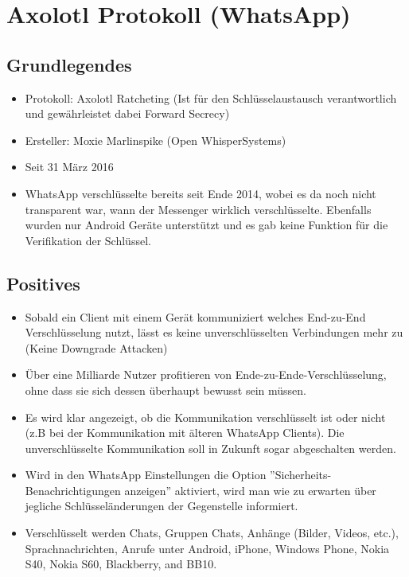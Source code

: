 


\newcommand{\SUBJECT}{Zusammenfassung}
\newcommand{\TITLE}{Informationssicherheit 1}



\section{Axolotl Protokoll (WhatsApp)}
\subsection{Grundlegendes}
\begin{itemize}
	\item Protokoll: Axolotl Ratcheting (Ist für den Schlüsselaustausch verantwortlich und gewährleistet dabei Forward Secrecy)
	\item Ersteller: Moxie Marlinspike (Open WhisperSystems)
	\item Seit 31 März 2016
	\item WhatsApp verschlüsselte bereits seit Ende 2014, wobei es da noch nicht transparent war, wann der Messenger wirklich verschlüsselte. Ebenfalls wurden nur Android Geräte unterstützt und es gab keine Funktion für die Verifikation der Schlüssel.
\end{itemize}

\subsection{Positives}
\begin{itemize}
	\item Sobald ein Client mit einem Gerät kommuniziert welches End-zu-End Verschlüsselung nutzt, lässt es keine unverschlüsselten Verbindungen mehr zu (Keine Downgrade Attacken)
	\item Über eine Milliarde Nutzer profitieren von Ende-zu-Ende-Verschlüsselung, ohne dass sie sich dessen überhaupt bewusst sein müssen. 
	\item Es wird klar angezeigt, ob die Kommunikation verschlüsselt ist oder nicht (z.B bei der Kommunikation mit älteren WhatsApp Clients). Die unverschlüsselte Kommunikation soll in Zukunft sogar abgeschalten werden.
	\item Wird in den WhatsApp Einstellungen die Option ''Sicherheits-Benachrichtigungen anzeigen'' aktiviert, wird man wie zu erwarten über jegliche Schlüsseländerungen der Gegenstelle informiert.
	\item Verschlüsselt werden Chats, Gruppen Chats, Anhänge (Bilder, Videos, etc.), Sprachnachrichten, Anrufe unter Android, iPhone, Windows Phone, Nokia S40, Nokia S60, Blackberry, and BB10.
\end{itemize}

